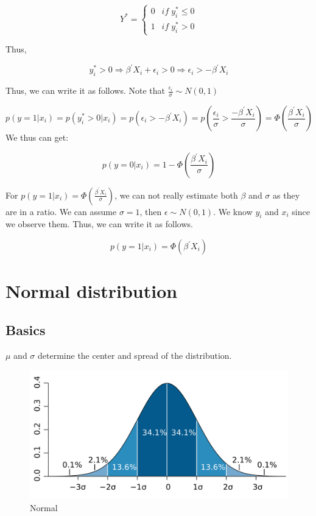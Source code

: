 \documentclass[]{book}
\begin{document}
\[
Y^*=\begin{cases} 0 \;\;\: if \;  y_i^* \leq 0 \\ 1 \;\;\: if \;  y_i^* > 0 \end{cases}
\]

Thus,

\[y_i^* > 0 \Rightarrow \beta^{'}X_i + \epsilon_i >0 \Rightarrow \epsilon_i > -\beta^{'}X_i\]

Thus, we can write it as follows. Note that \(\frac{ \epsilon_i}{\sigma} \sim N(0,1)\)

\[p(y=1|x_i)= p(y_i^* >0|x_i)=p(\epsilon_i > -\beta^{'}X_i)= p(\frac{ \epsilon_i}{\sigma}>\frac{-\beta^{'}X_i}{\sigma})=\Phi(\frac{\beta^{'}X_i}{\sigma}) \]
We thus can get:

\[p(y=0|x_i)=1-\Phi(\frac{\beta^{'}X_i}{\sigma})\]

For \(p(y=1|x_i)=\Phi(\frac{\beta^{'}X_i}{\sigma})\), we can not really estimate both \(\beta\) and \(\sigma\) as they are in a ratio. We can assume \(\sigma =1\), then \(\epsilon \sim N(0,1)\).
We know \(y_i\) and \(x_i\) since we observe them. Thus, we can write it as follows.

\[p(y=1|x_i)=\Phi(\beta^{'}X_i)\]

\hypertarget{normal-distribution}{%
\chapter{Normal distribution}\label{normal-distribution}}

\hypertarget{basics-1}{%
\section{Basics}\label{basics-1}}

\(\mu\) and \(\sigma\) determine the center and spread of the distribution.

\begin{figure}
\centering
\includegraphics{Standard_deviation_diagram.PNG}
\caption{Normal}
\end{figure}
\end{document}
